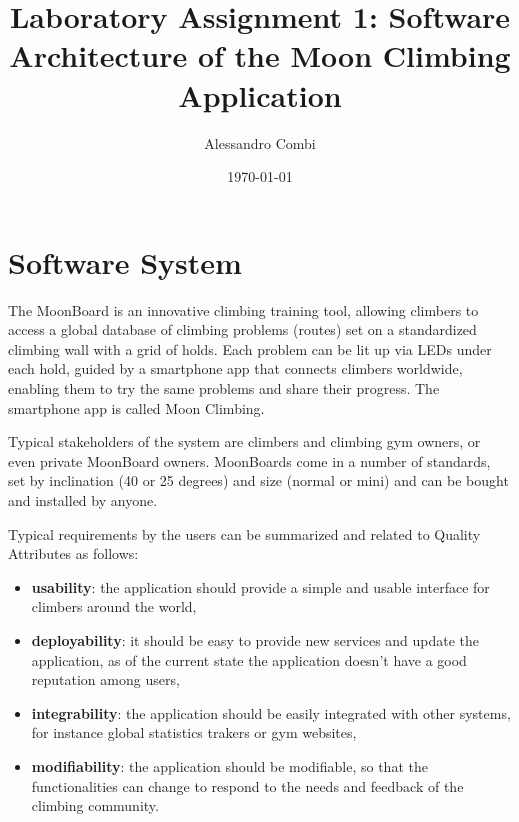 \documentclass{article}
\title{Laboratory Assignment 1: Software Architecture of the Moon Climbing Application}
\author{Alessandro Combi}
\date{\today}
\begin{document}
\maketitle
\newpage

\tableofcontents
\newpage

\section{Software System}%

The MoonBoard is an innovative climbing training tool, allowing climbers to access a global database of climbing problems (routes) set on a standardized climbing wall with a grid of holds. 
Each problem can be lit up via LEDs under each hold, guided by a smartphone app that connects climbers worldwide, enabling them to try the same problems and share their progress. 
The smartphone app is called Moon Climbing.

Typical stakeholders of the system are climbers and climbing gym owners, or even private MoonBoard owners. 
MoonBoards come in a number of standards, set by inclination (40 or 25 degrees) and size (normal or mini) and can be bought and installed by anyone.

Typical requirements by the users can be summarized and related to Quality Attributes as follows:
\begin{itemize}
    \item \textbf{usability}: the application should provide a simple and usable interface for climbers around the world,
    \item \textbf{deployability}: it should be easy to provide new services and update the application, as of the current state the application doesn't have a good reputation among users,
    \item \textbf{integrability}: the application should be easily integrated with other systems, for instance global statistics trakers or gym websites,
    \item \textbf{modifiability}: the application should be modifiable, so that the functionalities can change to respond to the needs and feedback of the climbing community.
\end{itemize}    
\end{document}
